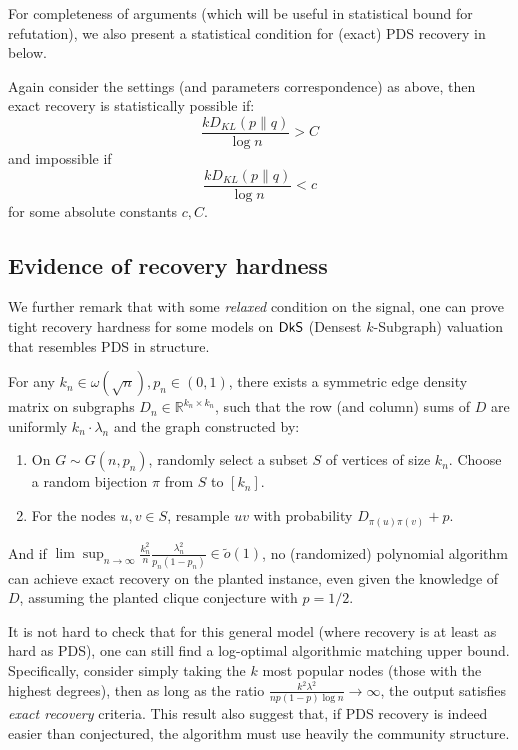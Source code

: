 \documentclass[final,12pt]{colt2023} %
\newcommand\1[1]{\mathbb{I}_{\left\{#1\right\}}}
\begin{document}
\spac For completeness of arguments (which will be useful in statistical bound for refutation), we also present a statistical condition for (exact) PDS recovery in below.
\begin{theorem}\label{PDSstatrec}Again consider the settings (and parameters correspondence) as above, then exact recovery is statistically possible if:
$$\frac{k D_{KL}(p\| q)}{\log n}> C$$and impossible if
$$\frac{k D_{KL}(p\| q)}{\log n}< c$$for some absolute constants $c, C$.
\end{theorem}

\subsection{Evidence of recovery hardness}
 We further remark that with some \emph{relaxed} condition on the signal, one can prove tight recovery hardness for some models on $\mathsf{DkS}$ (Densest $k$-Subgraph) valuation that resembles PDS in structure.
\begin{theorem}\label{PARTRecov}
For any $k_n\in \omega(\sqrt{n}), p_n\in (0, 1)$, there exists a symmetric edge density matrix on subgraphs $D_n\in \mathbb{R}^{k_n\times k_n}$, such that the row (and column) sums of $D$ are uniformly $k_n\cdot\lambda_n$ and the graph constructed by:
\begin{enumerate}
    \item On $G\sim G(n, p_n)$, randomly select a subset $S$ of vertices of size $k_n$. Choose a random bijection $\pi$ from $S$ to $[k_n].$
    \item For the nodes $u, v \in S$, resample $uv$ with probability $D_{\pi(u)\pi(v)}+p$.
\end{enumerate}
And if $\lim\sup_{n\to\infty}\frac{k_n^2}{n}\frac{\lambda_n^2}{p_n(1-p_n)}\in \tilde{o}(1)$, no (randomized) polynomial algorithm can achieve exact recovery on the planted instance, even given the knowledge of $D$, assuming the planted clique conjecture with $p=1/2$.
\end{theorem}
It is not hard to check that for this general model (where recovery is at least as hard as PDS), one can still find a log-optimal algorithmic matching upper bound. Specifically, consider simply taking the $k$ most popular nodes (those with the highest degrees), then as long as the ratio $\frac{k^2\lambda^2}{np(1-p)\log n}\to\infty$, the output satisfies \textit{exact recovery} criteria. This result also suggest that, if PDS recovery is indeed easier than conjectured, the algorithm must use heavily the community structure.
\end{document}
